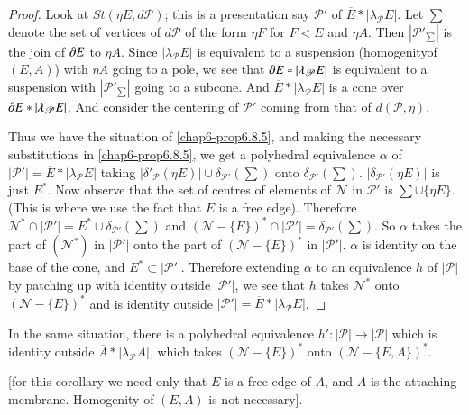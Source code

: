 \begin{proof}
Look at $St(\eta E, d\mathscr{P})$; this is a presentation say $\mathscr{P}'$ of $\overline{E}\ast |\lambda_{\mathscr{P}}E|$. Let $\sum$ denote the set of vertices of $d\mathscr{P}$ of the form $\eta F$ for $F<E$ and $\eta A$. Then $|\mathscr{P}'_{\sum}|$ is the join of $\partial E$ to $\eta A$. Since $|\lambda_{\mathscr{P}}E|$ is equivalent to a suspension (homogenity\pageoriginale of $(E,A)$) with $\eta A$ going to a pole, we see that $\partial E\ast |\lambda_{\mathscr{P}}E|$ is equivalent to a suspension with $|\mathscr{P}'_{\sum}|$ going to a subcone. And $\overline{E}\ast|\lambda_{\mathscr{P}}E|$ is a cone over $\partial E\ast |\lambda_{\mathscr{P}}E|$. And consider the centering of $\mathscr{P}'$ coming from that of $d(\mathscr{P},\eta)$. 


Thus we have the situation of \ref{chap6-prop6.8.5}, and making the necessary substitutions in \ref{chap6-prop6.8.5}, we get a polyhedral equivalence 
$\alpha$ of $|\mathscr{P}'|=\overline{E}\ast |\lambda_{\mathscr{P}}E|$ taking $|\delta'_{\mathscr{P}}(\eta E)|\cup \delta_{\mathscr{P}'}(\sum)$ onto $\delta_{\mathscr{P}'}(\sum)$. $|\delta_{\mathscr{P}'}(\eta E)|$ is just $E^{\ast}$. Now observe that the set of centres of elements of $\mathscr{N}$ in $\mathscr{P}'$ is $\sum\cup\{\eta E\}$. (This is where we use the fact that $E$ is a free edge). Therefore $\mathscr{N}^{\ast}\cap |\mathscr{P}'|=E^{\ast}\cup \delta_{\mathscr{P}'}(\sum)$ and $(\mathscr{N}-\{E\})^{\ast}\cap |\mathscr{P}'|=\delta_{\mathscr{P}'}(\sum)$. So $\alpha$ takes the part of $(\mathscr{N}^{\ast})$ in $|\mathscr{P}'|$ onto the part of $(\mathscr{N}-\{E\})^{\ast}$ in $|\mathscr{P}'|$. $\alpha$ is identity on the base of the cone, and $E^{\ast}\subset |\mathscr{P}'|$. Therefore extending $\alpha$ to an equivalence $h$ of $|\mathscr{P}|$ by patching up with identity outside 
$|\mathscr{P}'|$, we see that $h$ takes $\mathscr{N}^{\ast}$ onto $(\mathscr{N}-\{E\})^{\ast}$ and is identity outside $|\mathscr{P}'|=\overline{E}\ast|\lambda_{\mathscr{P}}E|$. 
\end{proof}

\begin{corollary}\label{chap6-coro6.8.7}
In the same situation, there is a polyhedral equivalence $h':|\mathscr{P}|\to |\mathscr{P}|$ which is identity outside $\overline{A}\ast |\lambda_{\mathscr{P}}A|$, which takes $(\mathscr{N}-\{E\})^{\ast}$ onto $(\mathscr{N}-\{E,A\})^{\ast}$.

[for this corollary we need only that $E$ is a free edge of $A$, and $A$ is the attaching membrane. Homogenity of $(E,A)$ is not necessary].
\end{corollary}

